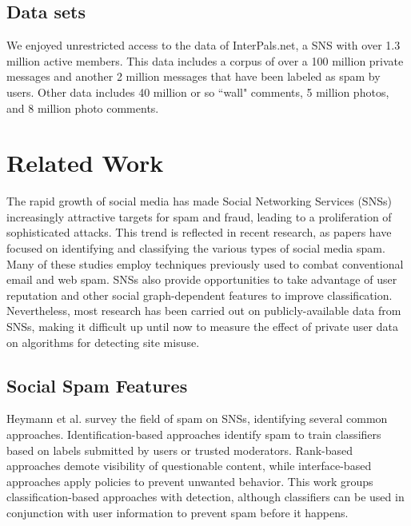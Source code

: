\documentclass[preprint]{acm_proc_article-sp}
\begin{document}
\subsection{Data sets}

We enjoyed unrestricted access to the data of InterPals.net, a SNS with 
over 1.3 million active members. This data includes a corpus of over a 
100 million private messages and another 2 million messages that have been 
labeled as spam by users. Other data includes 40 million or so ``wall" 
comments, 5 million photos, and 8 million photo comments. 


\section{Related Work} 

The rapid growth of social media has made Social Networking Services (SNSs) 
increasingly attractive targets for spam and fraud, leading to a proliferation 
of sophisticated attacks. This trend is reflected in recent research, as papers 
have focused on identifying and classifying the various types of social media spam. 
Many of these studies employ techniques previously used to combat conventional 
email and web spam. SNSs also provide opportunities to take advantage of user 
reputation and other social graph-dependent features to improve classification. 
Nevertheless, most research has been carried out on publicly-available data 
from SNSs, making it difficult up until now to measure the effect of private user 
data on algorithms for detecting site misuse.


\subsection{Social Spam Features}

Heymann et al. \cite{heymann} survey the field of spam on SNSs, identifying 
several common approaches. Identification-based approaches identify spam to 
train classifiers based on labels submitted by users or trusted moderators. 
Rank-based approaches demote visibility of questionable content, while interface-based 
approaches apply policies to prevent unwanted behavior. This work groups 
classification-based approaches with detection, although classifiers can be 
used in conjunction with user information to prevent spam before it happens.
\end{document}
